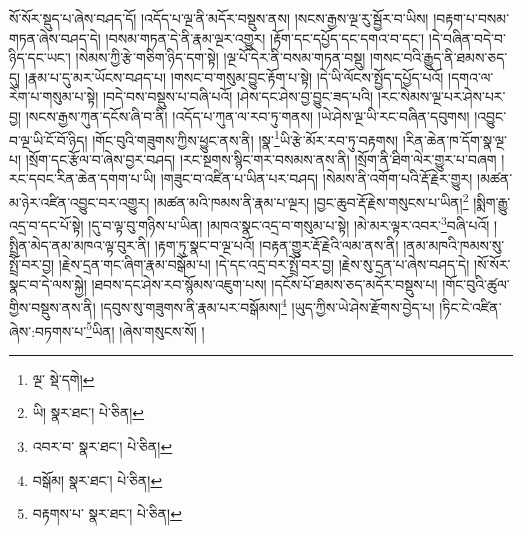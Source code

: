 སོ་སོར་སྡུད་པ་ཞེས་བཤད་དོ། །འདོད་པ་ལྔ་ནི་མདོར་བསྡུས་ནས། །སངས་རྒྱས་ལྔ་རུ་སྦྱོར་བ་ཡིས། །བརྟག་པ་བསམ་གཏན་ཞེས་བཤད་དེ། །བསམ་གཏན་དེ་ནི་རྣམ་ལྔར་འགྱུར། །རྟོག་དང་དཔྱོད་དང་དགའ་བ་དང་། །དེ་བཞིན་བདེ་བ་ཉིད་དང་ཡང་། །སེམས་ཀྱི་རྩེ་གཅིག་ཉིད་དག་སྟེ། །ལྔ་པོ་དེར་ནི་བསམ་གཏན་བསྡུ། །གསང་བའི་རྒྱུད་ནི་ཐམས་ཅད་དུ། །རྣམ་པ་དུ་མར་ཡོངས་བཤད་པ། །གསང་བ་གསུམ་བྱུང་རྟོག་པ་སྟེ། །དེ་ཡི་ལོངས་སྤྱོད་དཔྱོད་པའོ། །དགའ་ལ་རེག་པ་གསུམ་པ་སྟེ། །བདེ་བས་བསྡུས་པ་བཞི་པའོ། །ཤེས་དང་ཤེས་བྱ་བྱུང་ཟད་པའི། །རང་སེམས་ལྔ་པར་ཤེས་པར་བྱ། །སངས་རྒྱས་ཀུན་དངོས་ཞི་བ་ནི། །འདོད་པ་ཀུན་ལ་རབ་ཏུ་གནས། །ཡེ་ཤེས་ལྔ་ཡི་རང་བཞིན་དབུགས། །འབྱུང་བ་ལྔ་ཡི་ངོ་བོ་ཉིད། །གོང་བུའི་གཟུགས་ཀྱིས་ཕྱུང་ནས་ནི། །སྣ་\footnote{ལྔ་  སྡེ་དགེ། }ཡི་རྩེ་མོར་རབ་ཏུ་བརྟགས། །རིན་ཆེན་ཁ་དོག་སྣ་ལྔ་པ། །སྲོག་དང་རྩོལ་བ་ཞེས་བྱར་བཤད། །རང་སྔགས་སྙིང་གར་བསམས་ནས་ནི། །སྲོག་ནི་ཐིག་ལེར་གྱུར་པ་བཞག །རང་དབང་རིན་ཆེན་དགག་པ་ཡི། །གཟུང་བ་འཛིན་པ་ཡིན་པར་བཤད། །སེམས་ནི་འགོག་པའི་རྡོ་རྗེར་གྱུར། །མཚན་མ་ཉེར་འཛིན་འབྱུང་བར་འགྱུར། །མཚན་མའི་ཁམས་ནི་རྣམ་པ་ལྔར། །བྱང་ཆུབ་རྡོ་རྗེས་གསུངས་པ་ཡིན།\footnote{ཡི།  སྣར་ཐང་།  པེ་ཅིན། } །སྨིག་རྒྱུ་འདྲ་བ་དང་པོ་སྟེ། །དུ་བ་ལྟ་བུ་གཉིས་པ་ཡིན། །མཁའ་སྣང་འདྲ་བ་གསུམ་པ་སྟེ། །མེ་མར་ལྟར་འབར་\footnote{འབར་བ་  སྣར་ཐང་།  པེ་ཅིན། }བཞི་པའོ། །སྤྲིན་མེད་ནམ་མཁའ་ལྟ་བུར་ནི། །རྟག་ཏུ་སྣང་བ་ལྔ་པའོ། །བརྟན་གྱུར་རྡོ་རྗེའི་ལམ་ནས་ནི། །ནམ་མཁའི་ཁམས་སུ་སྤྲོ་བར་བྱ། །རྗེས་དྲན་གང་ཞིག་རྣམ་བསྒོམ་པ། །དེ་དང་འདྲ་བར་སྤྲོ་བར་བྱ། །རྗེས་སུ་དྲན་པ་ཞེས་བཤད་དེ། །སོ་སོར་སྣང་བ་དེ་ལས་སྐྱེ། །ཐབས་དང་ཤེས་རབ་སྙོམས་འཇུག་པས། །དངོས་པོ་ཐམས་ཅད་མདོར་བསྡུས་པ། །གོང་བུའི་ཚུལ་གྱིས་བསྡུས་ནས་ནི། །དབུས་སུ་གཟུགས་ནི་རྣམ་པར་བསྒོམས།\footnote{བསྒོམ།  སྣར་ཐང་།  པེ་ཅིན། } །ཡུད་ཀྱིས་ཡེ་ཤེས་རྫོགས་བྱེད་པ། །ཏིང་ངེ་འཛིན་ཞེས་:བཏགས་པ་\footnote{བརྟགས་པ་  སྣར་ཐང་།  པེ་ཅིན། }ཡིན། །ཞེས་གསུངས་སོ། །
